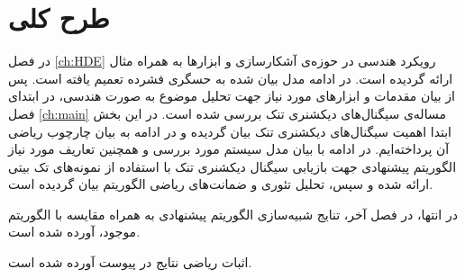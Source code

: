 \section{طرح کلی}

در فصل
\ref{ch:HDE}
رویکرد هندسی در حوزه‌ی آشکارسازی و ابزارها به همراه مثال ارائه گردیده است. در ادامه مدل بیان شده به حسگری فشرده تعمیم یافته است.
پس از بیان مقدمات و ابزار‌های مورد نیاز جهت تحلیل موضوع به صورت هندسی، در ابتدای فصل
\ref{ch:main}
مساله‌ی سیگنال‌های دیکشنری تنک بررسی شده است. در این بخش ابتدا اهمیت سیگنال‌های دیکشنری تنک بیان گردیده و در ادامه به بیان چارچوب ریاضی آن پرداخته‌ایم.
در ادامه با بیان مدل سیستم مورد بررسی و همچنین تعاریف مورد نیاز الگوریتم پیشنهادی جهت بازیابی سیگنال دیکشنری تنک با استفاده از نمونه‌های تک بیتی ارائه شده و سپس، تحلیل تئوری و ضمانت‌های ریاضی الگوریتم بیان گردیده است.

در انتها، در فصل آخر، تنایج شبیه‌سازی الگوریتم پیشنهادی به همراه مقایسه با الگوریتم موجود، آورده شده است.

اثبات ریاضی نتایج در پیوست آورده شده است.



